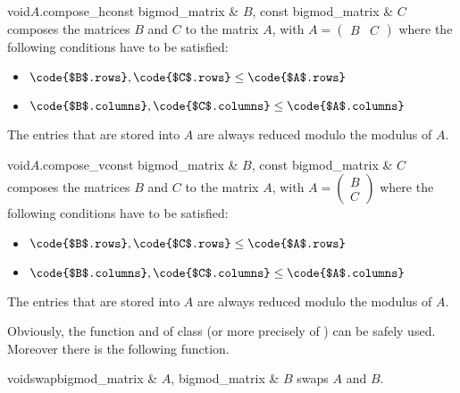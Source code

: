 \begin{fcode}{void}{$A$.compose_h}{const bigmod_matrix & $B$, const bigmod_matrix & $C$}
  composes the matrices $B$ and $C$ to the matrix $A$, with $A = \begin{pmatrix} B & C
  \end{pmatrix}$ where the following conditions have to be satisfied:
  \begin{itemize}
  \item $\code{$B$.rows}, \code{$C$.rows} \leq \code{$A$.rows}$
  \item $\code{$B$.columns}, \code{$C$.columns} \leq \code{$A$.columns}$
  \end{itemize}
  The entries that are stored into $A$ are always reduced modulo the modulus of $A$.
\end{fcode}

\begin{fcode}{void}{$A$.compose_v}{const bigmod_matrix & $B$, const bigmod_matrix & $C$}
  composes the matrices $B$ and $C$ to the matrix $A$, with $A = \begin{pmatrix} B \\ C
  \end{pmatrix}$ where the following conditions have to be satisfied:
  \begin{itemize}
  \item $\code{$B$.rows}, \code{$C$.rows} \leq \code{$A$.rows}$
  \item $\code{$B$.columns}, \code{$C$.columns} \leq \code{$A$.columns}$
  \end{itemize}
  The entries that are stored into $A$ are always reduced modulo the modulus of $A$.
\end{fcode}




Obviously, the function  and  of class 
(or more precisely of ) can be safely used.  Moreover there is the
following function.

\begin{fcode}{void}{swap}{bigmod_matrix & $A$, bigmod_matrix & $B$}
  swaps $A$ and $B$.
\end{fcode}



\ARTH


